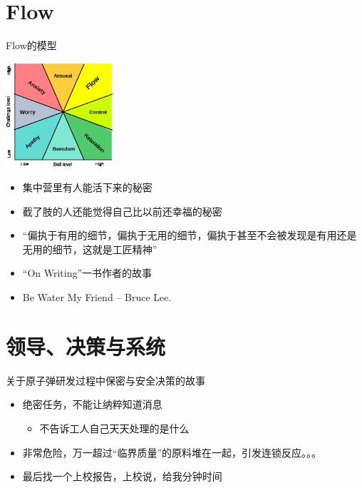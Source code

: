 \documentclass[presentation,dvipdfmx,CJKbookmarks]{beamer}
\begin{document}
\begin{CJK*}{UTF8}{simsun}
\section{Flow}
\label{sec:org69d5bf6}

\begin{frame}[label={sec:org53042b5}]{}
\begin{block}{Flow\thinspace 的模型}
\begin{center}
\includegraphics[width=4cm]{./images/flow.ps}
\end{center}

\begin{itemize}
\item 集中营里有人能活下来的秘密
\item 截了肢的人还能觉得自己比以前还幸福的秘密
\item “偏执于有用的细节，偏执于无用的细节，偏执于甚至不会被发现是有用还是无用的细节，这就是工匠精神”
\item “On Writing”一书作者的故事
\item Be Water My Friend -- Bruce Lee.
\end{itemize}
\end{block}
\end{frame}

\section{领导、决策与系统}
\label{sec:org32c1d51}

\begin{frame}[label={sec:org88f7e54}]{关于原子弹研发过程中保密与安全决策的故事}
\begin{itemize}
\item 绝密任务，不能让纳粹知道消息
\begin{itemize}
\item 不告诉工人自己天天处理的是什么
\end{itemize}
\item 非常危险，万一超过“临界质量”的原料堆在一起，引发连锁反应。。。
\item 最后找一个上校报告，上校说，给我\thinspace 分钟时间
\end{itemize}
\end{frame}


\end{CJK*}
\end{document}
